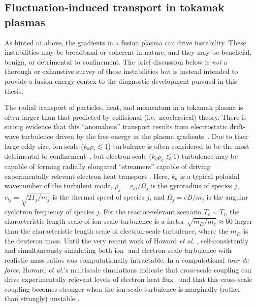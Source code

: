 \subsection{Fluctuation-induced transport in tokamak plasmas}
As hinted at above, the gradients in a fusion plasma can drive instability.
These instabilities may be broadband or coherent in nature, and
they may be beneficial, benign, or detrimental to confinement.
The brief discussion below is \emph{not}
a thorough or exhaustive survey of these instabilities but
is instead intended to provide a fusion-energy contex
to the diagnostic development pursued in this thesis.

The radial transport of particles, heat, and momentum in a tokamak plasma is
often larger than that predicted by collisional (i.e.\ neoclassical) theory.
There is strong evidence that this ``anomalous'' transport
results from electrostatic drift-wave turbulence
driven by the free energy in the plasma gradients~\cite{horton_drift_waves}.
Due to their large eddy size,
ion-scale ($k_{\theta} \rho_i \lesssim 1$) turbulence is often considered
to be the most detrimental to confinement~\cite{horton_drift_waves}, but
electron-scale ($k_{\theta} \rho_e \lesssim 1$) turbulence
may be capable of forming radially elongated ``streamers''
\cite{dorland_prl00}
capable of driving experimentally relevant electron heat transport
\cite{jenko_prl02}.
Here, $k_{\theta}$ is a typical poloidal wavenumber of the turbulent mode,
$\rho_j = v_{tj} / \Omega_j$ is the gyroradius of species $j$,
$v_{tj} = \sqrt{2 T_j / m_j}$ is the thermal speed of species $j$, and
$\Omega_j = e B / m_j$ is the angular cyclotron frequency of species $j$.
For the reactor-relevant scenario $T_e \sim T_i$,
the characteristic length scale of ion-scale turbulence is a factor
$\sqrt{m_D / m_e} \approx 60$ larger than
the characteristic length scale of electron-scale turbulence,
where the $m_D$ is the deuteron mass.
Until the very recent work of Howard \emph{et al.}
\cite{howard_pp14,howard_nf16},
self-consistently and simultaneously simulating
both ion- and electron-scale turbulence with realistic mass ratios
was computationally intractable.
In a computational \emph{tour de force},
Howard \emph{et al.}'s multiscale simulations indicate
that cross-scale coupling can drive
experimentally relevant levels of electron heat flux~\cite{howard_pp14} and
that this cross-scale coupling becomes stronger
when the ion-scale turbulence is marginally (rather than strongly) unstable
\cite{howard_nf16}.

